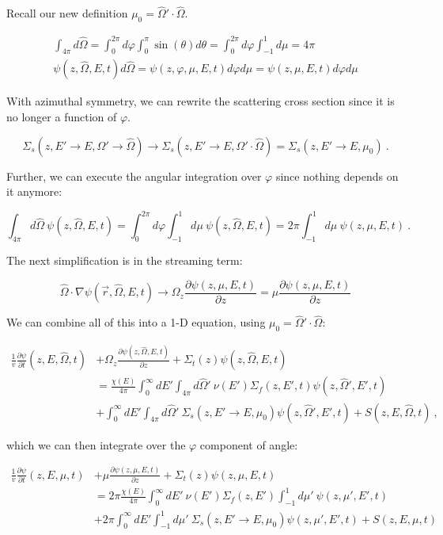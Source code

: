 \documentclass[12pt]{article}
\newcommand{\omvec}{\ensuremath{\hat{\Omega}}}
\newcommand{\vOmega}{\ensuremath{\hat{\Omega}}}
\begin{document}
Recall our new definition $\mu_0 = \vOmega' \cdot \vOmega$.

\begin{gather*}
\int_{4 \pi} d\vOmega =
\int_0^{2\pi} d\varphi \int_{0}^{\pi} \sin(\theta) d\theta = 
\int_0^{2\pi} d\varphi \int_{-1}^1 d\mu = 4\pi \\
\psi(z,\vOmega,E,t) d\vOmega = \psi(z,\varphi, \mu,E,t) d\varphi  d\mu =
\psi(z, \mu,E,t) d\varphi  d\mu 
\end{gather*}

With azimuthal symmetry, we can rewrite the scattering cross section since it
is no longer a function of $\varphi$.

\[\Sigma_s(z, E' \rightarrow E, \vOmega' \rightarrow \vOmega) \rightarrow
\Sigma_s(z, E' \rightarrow E, \vOmega' \cdot \vOmega) = \Sigma_s(z, E' \rightarrow E, \mu_0) \:.\]

Further, we can execute the angular integration over $\varphi$ since nothing
depends on it anymore:

\[\int_{4 \pi} d\vOmega\: \psi(z, \vOmega, E, t) =
\int_0^{2\pi} d\varphi \int_{-1}^1 d\mu \:\psi(z, \vOmega, E, t) =
2 \pi \int_{-1}^1 d\mu \:\psi(z, \mu, E, t)\:.\]

The next simplification is in the streaming term:

\[\vOmega \cdot \nabla \psi(\vec{r}, \vOmega, E, t) \rightarrow
\Omega_z \frac{\partial \psi(z, \mu, E, t)}{\partial z} =
\mu \frac{\partial \psi(z, \mu, E, t)}{\partial z} \]

We can combine all of this into a 1-D equation, using
$\mu_0 = \vOmega' \cdot \vOmega$:

\begin{align*}
\frac{1}{v}\frac{\partial \psi}{\partial t}(z,E,\omvec,t) &+
\Omega_z \frac{\partial \psi(z, \vOmega, E, t)}{\partial z} +
\Sigma_t(z)\psi(z, \vOmega, E, t)  \\
&= \frac{\chi(E)}{4 \pi} \int_0^{\infty} dE'\int_{4 \pi} d\vOmega'\: 
\nu(E')\Sigma_f(z,E',t)\psi(z, \vOmega', E', t)  \\
&+ \int_0^{\infty} dE' \int_{4 \pi} d\vOmega'\:
\Sigma_s(z, E' \rightarrow E, \mu_0)\psi(z, \vOmega', E', t) + S(z, E, \vOmega, t)\:,
\end{align*}

which we can then integrate over the $\varphi$ component of angle:

\begin{align*}
\frac{1}{v}\frac{\partial \psi}{\partial t}(z,E,\mu,t) &+
\mu \frac{\partial \psi(z, \mu, E, t)}{\partial z} +
\Sigma_t(z)\psi(z, \mu, E, t) \\
&= 2\pi\frac{\chi(E)}{4 \pi} \int_0^{\infty} dE' \:
\nu(E')\Sigma_f(z,E') \int_{-1}^1 d\mu'\: \psi(z, \mu', E', t) \\
&+ 2\pi\int_0^{\infty} dE' \int_{-1}^1 d\mu'\:
\Sigma_s(z, E' \rightarrow E, \mu_0)\psi(z, \mu', E', t)  + S(z, E, \mu, t)
\end{align*}
\end{document}
